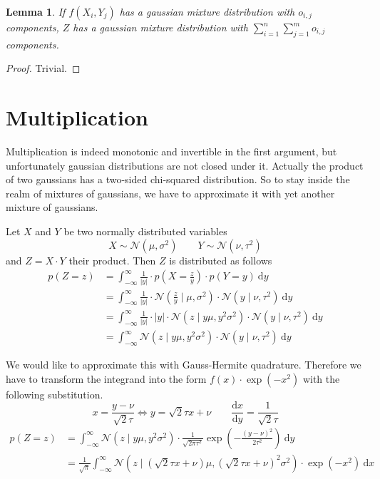 \documentclass[11pt,a4paper]{report}
\newtheorem{lemma}{Lemma}
\begin{document}
\begin{lemma}
  If $f(X_{i}, Y_{j})$ has a gaussian mixture distribution with $o_{i,j}$
  components, $Z$ has a gaussian mixture distribution with
  $\sum_{i = 1}^{n} \sum_{j = 1}^{m} o_{i,j}$ components.
\end{lemma}

\begin{proof}
  Trivial.
\end{proof}

\section{Multiplication}

Multiplication is indeed monotonic and invertible in the first argument, but
unfortunately gaussian distributions are not closed under it. Actually the
product of two gaussians has a two-sided chi-squared distribution. So to stay
inside the realm of mixtures of gaussians, we have to approximate it with yet
another mixture of gaussians.

Let $X$ and $Y$ be two normally distributed variables
\begin{equation*}
  X \sim \mathcal{N}(\mu, \sigma^{2}) \qquad Y \sim \mathcal{N}(\nu, \tau^{2})
\end{equation*}
and $Z = X \cdot Y$ their product. Then $Z$ is distributed as follows
\begin{align*}
  p(Z = z) & = \int_{-\infty}^{\infty} \frac{1}{|y|} \cdot p\left(X = \frac{z}{y}\right) \cdot p(Y = y)~\mathrm{d}y\\
           & = \int_{-\infty}^{\infty} \frac{1}{|y|} \cdot \mathcal{N}\left( \frac{z}{y} \mid \mu, \sigma^{2} \right) \cdot \mathcal{N}(y \mid \nu, \tau^{2})~\mathrm{d}y\\
           & = \int_{-\infty}^{\infty} \frac{1}{|y|} \cdot |y| \cdot \mathcal{N}\left( z \mid y\mu, y^{2}\sigma^{2} \right) \cdot \mathcal{N}(y \mid \nu, \tau^{2})~\mathrm{d}y\\
           & = \int_{-\infty}^{\infty} \mathcal{N}\left( z \mid y\mu, y^{2}\sigma^{2} \right) \cdot \mathcal{N}(y \mid \nu, \tau^{2})~\mathrm{d}y
\end{align*}

We would like to approximate this with Gauss-Hermite quadrature. Therefore we
have to transform the integrand into the form $f(x) \cdot \exp(-x^{2})$ with the
following substitution.
\begin{equation*}
  x = \frac{y - \nu}{\sqrt{2}\tau} \Leftrightarrow y = \sqrt{2}\tau x + \nu \qquad \frac{\mathrm{d}x}{\mathrm{d}y} = \frac{1}{\sqrt{2}\tau}
\end{equation*}
\begin{align*}
  p(Z = z) & = \int_{-\infty}^{\infty} \mathcal{N}\left( z \mid y\mu, y^{2}\sigma^{2} \right) \cdot \frac{1}{\sqrt{2\pi\tau^{2}}} \exp\left( -\frac{(y - \nu)^{2}}{2\tau^{2}} \right)~\mathrm{d}y\\
           & = \frac{1}{\sqrt{\pi}} \int_{-\infty}^{\infty} \mathcal{N}\left( z \mid \left(\sqrt{2}\tau x + \nu\right)\mu, \left(\sqrt{2}\tau x + \nu\right)^{2}\sigma^{2} \right) \cdot \exp\left( -x^{2} \right)~\mathrm{d}x
\end{align*}
\end{document}
